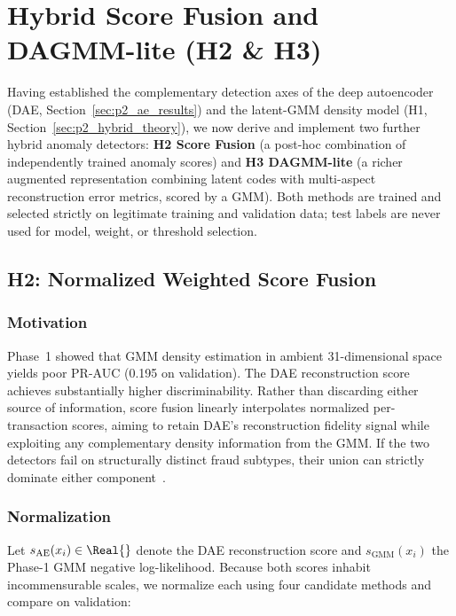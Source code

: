 
\section{Hybrid Score Fusion and DAGMM-lite (H2 \& H3)}
\label{sec:p2_hybrid}

Having established the complementary detection axes of the deep autoencoder (DAE, Section~\ref{sec:p2_ae_results}) and the latent-GMM density model (H1, Section~\ref{sec:p2_hybrid_theory}), we now derive and implement two further hybrid anomaly detectors: \textbf{H2 Score Fusion} (a post-hoc combination of independently trained anomaly scores) and \textbf{H3 DAGMM-lite} (a richer augmented representation combining latent codes with multi-aspect reconstruction error metrics, scored by a GMM). Both methods are trained and selected strictly on legitimate training and validation data; test labels are never used for model, weight, or threshold selection.

\subsection{H2: Normalized Weighted Score Fusion}
\label{sec:p2_h2_fusion}

\subsubsection{Motivation}
Phase~1 showed that GMM density estimation in ambient 31-dimensional space yields poor PR-AUC (0.195 on validation). The DAE reconstruction score achieves substantially higher discriminability. Rather than discarding either source of information, score fusion linearly interpolates normalized per-transaction scores, aiming to retain DAE's reconstruction fidelity signal while exploiting any complementary density information from the GMM. If the two detectors fail on structurally distinct fraud subtypes, their union can strictly dominate either component~\cite{kuncheva2004combining}.

\subsubsection{Normalization}
Let $s_{\text{AE}}(x_i) \in \Real{}$ denote the DAE reconstruction score and $s_{\text{GMM}}(x_i)$ the Phase-1 GMM negative log-likelihood. Because both scores inhabit incommensurable scales, we normalize each using four candidate methods and compare on validation:

